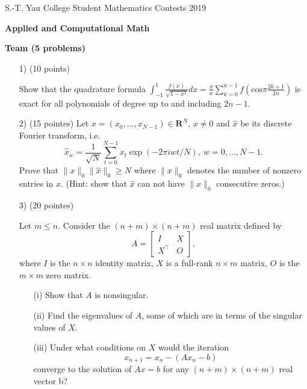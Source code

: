 \documentclass[10pt]{article}
\renewcommand{\leq}{\leqslant}
\renewcommand{\geq}{\geqslant}
\begin{document}
\begin{center}
S.-T. Yau College Student Mathematics Contests 2019

\vspace{0.1cm}

\Large {\bf Applied and Computational Math}

\vspace{0.1cm}

\large {\bf Team (5 problems)}

\vspace{0.1cm}
\end{center}

\begin{enumerate}
\item[1)](10 points)

    Show that the quadrature formula $\displaystyle \int_{-1}^{1} \frac{f(x)}{\sqrt{1 - x^{2}}}dx = \frac{\pi}{n}\sum\limits_{k=0}^{n-1}f\left(\text{cos}\pi\frac{2k+1}{2n}\right) $ is exact for all polynomials of degree up to and including $2n - 1$.

\item[2)](15 pointes)
    Let $x = (x_0,\ldots,x_{N-1})\in\mathbf{R}^N$, $x\neq0$ and $\hat{x}$ be its discrete Fourier transform, i.e.\
    $$\hat{x}_w = \frac{1}{\sqrt{N}}\sum_{t=0}^{N-1} x_t\exp(-2\pi i w t/N),~w=0,\ldots,N-1.$$
    Prove that $\|x\|_0\|\hat{x}\|_0\geq N$ where $\|x\|_0$ denotes the number of nonzero entries in $x$. (Hint: show that $\hat x$ can not have $\|x\|_0$ consecutive zeros.)

\item[3)](20 pointes)

    Let $m\leq n$. Consider the $(n + m) \times (n + m)$ real matrix defined by
    \begin{equation*}
    A =  \left[ \begin{matrix} I & X \\ X^{\top} & O \end{matrix} \right],
    \end{equation*}
    where $I$ is the $n \times n$ identity matrix, $X$ is a full-rank $n \times m$ matrix, $O$ is the $m \times m$ zero matrix.
    \begin{itemize}
        \item[(i)] Show that $A$ is nonsingular.
        \item[(ii)] Find the eigenvalues of $A$, some of which are in terms of the singular values of $X$.
        \item[(iii)] Under what conditions on $X$ would the iteration
        \begin{equation*}
        x_{n+1} = x_{n} - (A x_{n} - b)
        \end{equation*}
        converge to the solution of $Ax = b$ for any  $(n + m) \times (n + m)$ real vector b?
    \end{itemize}


\end{enumerate}
\end{document}
